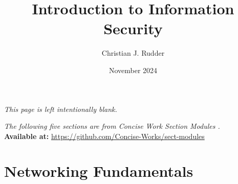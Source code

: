 \documentclass{memoir}
\title{Introduction to Information Security}
\author{Christian J. Rudder}
\date{November 2024}
\begin{document}
\maketitle
\setcounter{tocdepth}{2}

\tableofcontents

\newpage
\thispagestyle{empty}
\mbox{}
\vfill
\begin{center}
    \textit{This page is left intentionally blank.}
\end{center}
\vfill
\newpage
\thispagestyle{empty}
\mbox{}
\vfill
\begin{center}
    \textit{The following five sections are from Concise Work Section Modules \cite{concise_works_modules}.}\\
    \textbf{Available at:} \url{https://github.com/Concise-Works/sect-modules}
\end{center}
\vfill

% 
% 
% 
% 
% 

\chapter{Networking Fundamentals}



\end{document}
